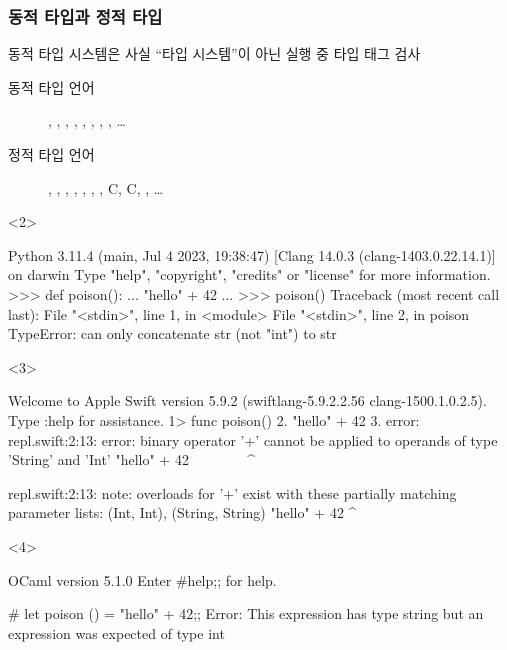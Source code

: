 \documentclass{beamer}
\def\cplus{\raisebox{.4ex}{\relsize{-3}{\texttt{+}}}}
\def\C++{C\nolinebreak\hspace{-.081em}\cplus\nolinebreak\hspace{-0.02em}\cplus}
\begin{document}
\begin{frame}[c, fragile]
  \frametitle{동적 타입과 정적 타입}

  동적 타입 시스템은 사실 ``타입 시스템''이 아닌 실행 중 타입 태그 검사
  {\footnotesize\begin{description}
    \item[동적 타입 언어] , , , , , , , , \ldots
    \item[정적 타입 언어] , , , , , , , C, \C++, , \ldots
  \end{description}}

  \begin{onlyenv}<2>
    \begin{pycode}
Python 3.11.4 (main, Jul  4 2023, 19:38:47) [Clang 14.0.3 (clang-1403.0.22.14.1)] on darwin
Type "help", "copyright", "credits" or "license" for more information.
>>> def poison():
...     "hello" + 42
...
>>> poison()
Traceback (most recent call last):
  File "<stdin>", line 1, in <module>
  File "<stdin>", line 2, in poison
TypeError: can only concatenate str (not "int") to str
    \end{pycode}
  \end{onlyenv}
  
  \begin{onlyenv}<3>
    \begin{swiftcode}
  Welcome to Apple Swift version 5.9.2 (swiftlang-5.9.2.2.56 clang-1500.1.0.2.5).
Type :help for assistance.
  1> func poison() {
  2.     "hello" + 42
  3. }
error: repl.swift:2:13: error: binary operator '+' cannot be applied to operands of type 'String' and 'Int'
    "hello" + 42
    ~~~~~~~ ^ ~~

repl.swift:2:13: note: overloads for '+' exist with these partially matching parameter lists: (Int, Int), (String, String)
    "hello" + 42
            ^
    \end{swiftcode}
  \end{onlyenv}

  \begin{onlyenv}<4>
    \begin{ocamlcode}
OCaml version 5.1.0
Enter #help;; for help.

# let poison () = "hello" + 42;;
Error: This expression has type string but an expression was expected of type
         int
    \end{ocamlcode}
  \end{onlyenv}


\end{frame}
\end{document}
